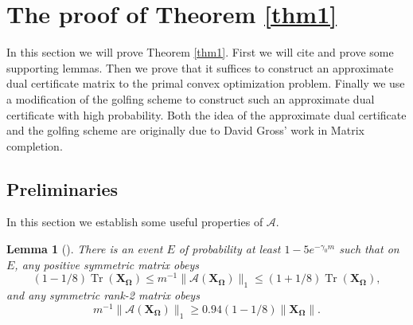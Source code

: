 \documentclass[11pt]{article}
\newtheorem{lemma}[theorem]{Lemma}
\newcommand{\<}{\langle}
\renewcommand{\>}{\rangle}
\newcommand{\mtx}[1]{\bm{#1}}
\newcommand{\tr}{\operatorname{Tr}}
\numberwithin{equation}{section}
\newcommand{\cA}{\mathcal{A}}
\begin{document}
\section{The proof of Theorem \ref{thm1}}
In this section we will prove Theorem \ref{thm1}. First we will cite and prove some supporting lemmas. Then we prove that it 
suffices to construct an approximate dual certificate matrix to the primal convex optimization problem. Finally we use a 
modification of the golfing scheme to construct such an approximate dual certificate with high probability. Both the idea of the 
approximate dual certificate and the golfing scheme are originally due to David Gross' work \cite{Gross09} in Matrix 
completion.

\subsection{Preliminaries} 
In this section we establish some useful properties of $\cA$.
\begin{lemma}[\cite{PhaseLift2}]
\label{lem:PL}
There is an event $E$ of probability at least $1 - 5e^{-\gamma_0 m}$
such that on $E$, any positive symmetric matrix obeys 
\begin{equation}
\label{ineq:l1-trace}
(1 - 1/8) \tr(\mtx{X_\Omega}) \leq m^{-1} \|\cA(\mtx{X_\Omega})\|_1 \le (1 + 1/8) \tr(\mtx{X_\Omega}),  
\end{equation}
and any symmetric rank-2 matrix obeys
\begin{equation}
\label{ineq: l1-lowrank-mlarge}
m^{-1} \|\cA(\mtx{X_\Omega})\|_1 \ge 0.94 (1 - 1/8) \|\mtx{X_\Omega}\|.
\end{equation}
\end{lemma}
\end{document}
